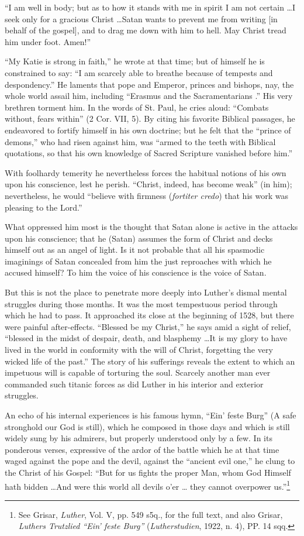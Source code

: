 “I am well in body; but as to how it stands with me in spirit I am not
certain \dots I seek only for a gracious Christ \dots Satan wants to prevent
me from writing [in behalf of the gospel], and to drag me down with him
to hell. May Christ tread him under foot. Amen!”

“My Katie is strong in faith,” he wrote at that time; but of himself he is
constrained to say: “I am scarcely able to breathe because of tempests and
despondency.” He laments that pope and Emperor, princes and bishops,
nay, the whole world assail him, including “Erasmus and the Sacramentarians
.” His very brethren torment him. In the words of St. Paul, he cries
aloud: “Combats without, fears within” (2 Cor. VII, 5). By citing his
favorite Biblical passages, he endeavored to fortify himself in his own doctrine;
but he felt that the “prince of demons,” who had risen against him,
was “armed to the teeth with Biblical quotations, so that his own knowledge
of Sacred Scripture vanished before him.”

With foolhardy temerity he nevertheless forces the habitual notions of
his own upon his conscience, lest he perish. “Christ, indeed, has become
weak” (in him); nevertheless, he would “believe with firmness (\textit{fortiter
credo}) that his work was pleasing to the Lord.”

What oppressed him most is the thought that Satan alone is
active in the attacks upon his conscience; that he (Satan) assumes
the form of Christ and decks himself out as an angel of light. Is it
not probable that all his spasmodic imaginings of Satan concealed
from him the just reproaches with which he accused himself? To
him the voice of his conscience is the voice of Satan.

But this is not the place to penetrate more deeply into Luther’s
dismal mental struggles during those months. It was the most tempestuous
period through which he had to pass. It approached its close
at the beginning of 1528, but there were painful after-effects.
“Blessed be my Christ,” he says amid a sight of relief, “blessed in the
midst of despair, death, and blasphemy \dots It is my glory to have
lived in the world in conformity with the will of Christ, forgetting
the very wicked life of the past.” The story of his sufferings reveals
the extent to which an impetuous will is capable of torturing the
soul. Scarcely another man ever commanded such titanic forces as
did Luther in his interior and exterior struggles.

An echo of his internal experiences is his famous hymn, “Ein’
feste Burg” (A safe stronghold our God is still), which he composed
in those days and which is still widely sung by his admirers, but
properly understood only by a few. In its ponderous verses, expressive
of the ardor of the battle which he at that time waged against the
pope and the devil, against the “ancient evil one,” he clung to the
Christ of his Gospel: “But for us fights the proper Man, whom God
Himself hath bidden \dots And were this world all devils o'er \dots
they cannot overpower us.”\footnote{See Grisar, \textit{Luther}, Vol. V, pp. 549 s5q., for the full text, and also Grisar, \textit{Luthers
Trutzlied “Ein’ feste Burg”} (\textit{Lutherstudien}, 1922, n. 4), PP. 14 sqq.}

